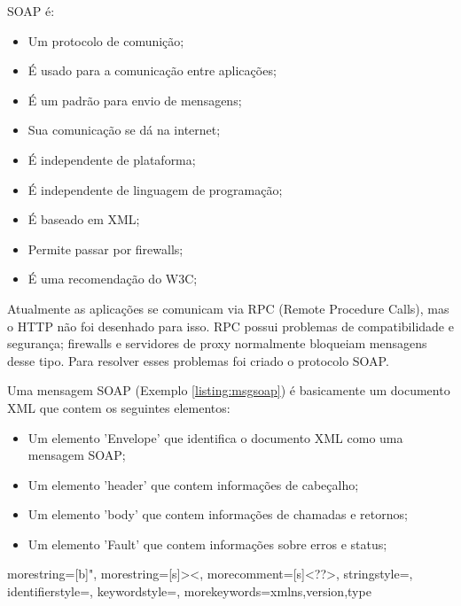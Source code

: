 SOAP é:

\begin{itemize}
	\item Um protocolo de comunição;
	\item É usado para a comunicação entre aplicações;
	\item É um padrão para envio de mensagens;
	\item Sua comunicação se dá na internet;
	\item É independente de plataforma;
	\item É independente de linguagem de programação;
	\item É baseado em XML;
	\item Permite passar por firewalls;
	\item É uma recomendação do W3C;
\end{itemize}

Atualmente as aplicações se comunicam via RPC (Remote Procedure Calls), mas o HTTP não foi desenhado para isso. RPC possui problemas de compatibilidade e segurança; firewalls e servidores de proxy normalmente bloqueiam mensagens desse tipo. Para resolver esses problemas foi criado o protocolo SOAP.

Uma mensagem SOAP (Exemplo \ref{listing:msgsoap}) é basicamente um documento XML que contem os seguintes elementos:

\begin{itemize}
	\item Um elemento 'Envelope' que identifica o documento XML como uma mensagem SOAP;
	\item Um elemento 'header' que contem informações de cabeçalho;
	\item Um elemento 'body' que contem informações de chamadas e retornos;
	\item Um elemento 'Fault' que contem informações sobre erros e status;
\end{itemize}




{
  morestring=[b]",
  morestring=[s]{>}{<},
  morecomment=[s]{<?}{?>},
  stringstyle=\color{black},
  identifierstyle=\color{darkblue},
  keywordstyle=\color{cyan},
  morekeywords={xmlns,version,type}%
}


